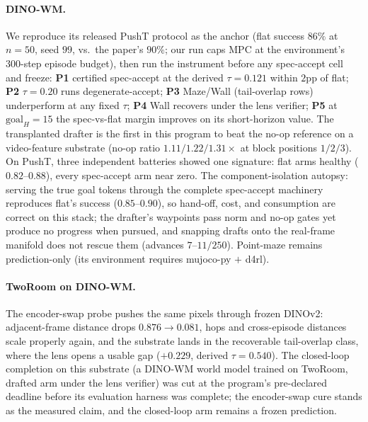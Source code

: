 \documentclass{article}
\begin{document}


\paragraph{DINO-WM.} We reproduce its released PushT protocol as the anchor
(flat success $86\%$ at $n{=}50$, seed $99$, vs.\ the paper's $90\%$; our run
caps MPC at the environment's 300-step episode budget), then run the instrument
before any spec-accept cell and freeze: \textbf{P1} certified spec-accept at
the derived $\tau{=}0.121$ within $2$pp of flat; \textbf{P2} $\tau{=}0.20$ runs
degenerate-accept; \textbf{P3} Maze/Wall (tail-overlap rows) underperform at
any fixed $\tau$; \textbf{P4} Wall recovers under the lens verifier;
\textbf{P5} at $\mathrm{goal}_H{=}15$ the spec-vs-flat margin improves on its
short-horizon value. The transplanted drafter is the first in this program to
beat the no-op reference on a video-feature substrate (no-op ratio
$1.11/1.22/1.31\times$ at block positions $1/2/3$). On PushT, three
independent batteries showed one signature: flat arms healthy
($0.82$--$0.88$), every spec-accept arm near zero. The component-isolation
autopsy: serving the true goal tokens through the complete spec-accept
machinery reproduces flat's success ($0.85$--$0.90$), so hand-off, cost, and
consumption are correct on this stack; the drafter's waypoints pass norm and
no-op gates yet produce no progress when pursued, and snapping drafts onto the
real-frame manifold does not rescue them (advances $7$--$11/250$).
Point-maze remains prediction-only (its environment requires mujoco-py $+$
d4rl).

\paragraph{TwoRoom on DINO-WM.} The encoder-swap probe pushes the same pixels
through frozen DINOv2: adjacent-frame distance drops $0.876 \to 0.081$, hops
and cross-episode distances scale properly again, and the substrate lands in
the recoverable tail-overlap class, where the lens opens a usable gap
($+0.229$, derived $\tau{=}0.540$). The closed-loop completion on this
substrate (a DINO-WM world model trained on TwoRoom, drafted arm under the
lens verifier) was cut at the program's pre-declared deadline before its
evaluation harness was complete; the encoder-swap cure stands as the measured
claim, and the closed-loop arm remains a frozen prediction.
\end{document}
